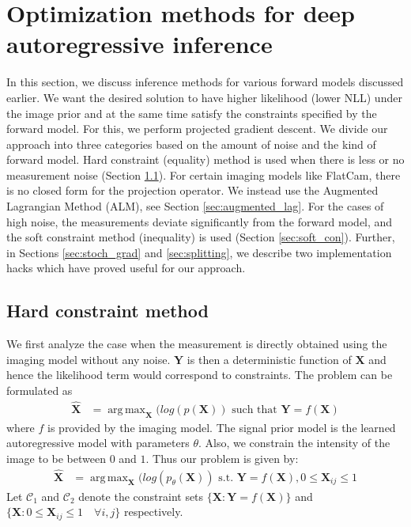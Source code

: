 \documentclass[journal,twoside]{IEEEtran}
\DeclareMathOperator*{\argmax}{arg\,max}
\newcommand{\X}{\mathbf{X}}
\newcommand{\Y}{\mathbf{Y}}
\begin{document}
\section{Optimization methods for deep autoregressive inference}
In this section, we discuss inference methods for various forward models discussed earlier. We want the desired solution to have higher likelihood (lower NLL) under the image prior and at the same time satisfy the constraints specified by the forward model. For this, we perform projected gradient descent. We divide our approach into three categories based on the amount of noise and the kind of forward model. Hard constraint (equality) method is used when there is less or no measurement noise (Section \ref{sec:hard_con}). For certain imaging models like FlatCam, there is no closed form for the projection operator. We instead use the Augmented Lagrangian Method (ALM), see Section \ref{sec:augmented_lag}. For the cases of high noise, the measurements deviate significantly from the forward model, and the soft constraint method (inequality) is used (Section \ref{sec:soft_con}). Further, in Sections \ref{sec:stoch_grad} and \ref{sec:splitting}, we describe two implementation hacks which have proved useful for our approach. 

\subsection{Hard constraint method}
\label{sec:hard_con}
We first analyze the case when the measurement is directly obtained using the imaging model without any noise. $\Y$ is then a deterministic function of $\X$ and hence the likelihood term would correspond to constraints. The problem can be formulated as 
\begin{align}
\mathbf{\hat{X}} &= \argmax_{\X} ( log(p(\X)) \text{ such that } \Y = f(\X)
\end{align}
where $f$ is provided by the imaging model. The signal prior model is the learned autoregressive model with parameters $\theta$. Also, we constrain the intensity of the image to be between $0$ and $1$. Thus our problem is given by:
\begin{align}
\mathbf{\hat{X}} &= \argmax_{\X} ( log(p_{\theta}(\X)) \text{ s.t. } \Y = f(\X), 0 \leq \X_{ij} \leq 1
\end{align}
Let $\mathcal{C}_1$ and $\mathcal{C}_2$ denote the constraint sets $\{\X:\Y = f(\X)\}$ and $\{\X: 0 \leq \X_{ij} \leq 1 \quad \forall i,j \}$ respectively.
\end{document}
